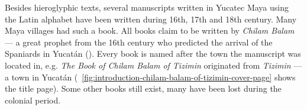 \documentclass[../main.tex]{subfiles}
\begin{document}
Besides hieroglyphic texts, several manuscripts written in Yucatec Maya using the Latin alphabet 
have been written  during 16th, 17th and 18th century.
Many Maya villages had such a book.
All books claim to be written by \emph{Chilam Balam} --- a great prophet from the 16th century
who predicted the arrival of the Spaniards in Yucat\'{a}n
().
Every book is named after the town the manuscript was located in, e.g. 
\emph{The Book of Chilam Balam of Tizimin} originated from \emph{Tizimin} --- a town 
in Yucat\'{a}n
(~\ref{fig:introduction-chilam-balam-of-tizimin-cover-page} shows the title page).
Some other books still exist, many have been lost during the colonial period.
\end{document}
